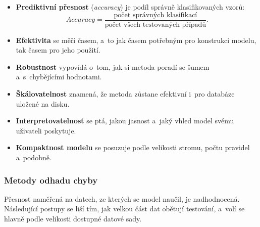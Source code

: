 \documentclass[11pt,a4paper]{article}
\theoremstyle{definition}
\begin{document}
\begin{itemize}
\item \textbf{Prediktivní přesnost} (\emph{accuracy}) je podíl správně klasifikovaných vzorů:
      \[ \mathit{Accuracy}=\frac{\text{počet správných klasifikací}}
         {\text{počet všech testovaných případů}}. \]
\item \textbf{Efektivita} se měří časem, a~to jak časem potřebným pro konstrukci modelu, tak
      časem pro jeho použití.
\item \textbf{Robustnost} vypovídá o~tom, jak si metoda poradí se šumem a~s~chybějícími
      hodnotami.
\item \textbf{Škálovatelnost} znamená, že metoda zůstane efektivní i~pro databáze uložené na
      disku.
\item \textbf{Interpretovatelnost} se ptá, jakou jasnost a~jaký vhled model svému uživateli
      poskytuje.
\item \textbf{Kompaktnost modelu} se posuzuje podle velikosti stromu, počtu pravidel a~podobně.
\end{itemize}

\subsubsection{Metody odhadu chyby}

Přesnost naměřená na datech, ze kterých se model naučil, je nadhodnocená. Následující postupy
se liší tím, jak velkou část dat obětují testování, a~volí se hlavně podle velikosti dostupné
datové sady.
\end{document}
